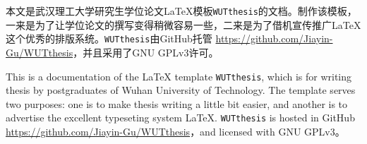 
\begin{WUTChineseabstract}
\par 本文是武汉理工大学研究生学位论文{\LaTeX}模板\texttt{WUTthesis}的文档。制作该模板，一来是为了让学位论文的撰写变得稍微容易一些，二来是为了借机宣传推广{\LaTeX}这个优秀的排版系统。\texttt{WUTthesis}由GitHub托管 \url{https://github.com/Jiayin-Gu/WUTthesis}，并且采用了GNU GPLv3许可。
\end{WUTChineseabstract}



















\begin{WUTEnglishabstract}
\par This is a documentation of the {\LaTeX} template \texttt{WUTthesis}, which is for writing thesis by postgraduates of Wuhan University of Technology. The template serves two purposes: one is to make thesis writing a little bit easier, and another is to advertise the excellent typeseting system {\LaTeX}. \texttt{WUTthesis} is hosted in GitHub \url{https://github.com/Jiayin-Gu/WUTthesis}，and licensed with GNU GPLv3。
\end{WUTEnglishabstract}









